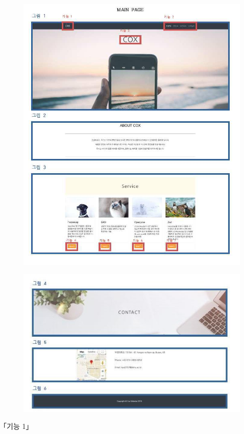 \documentclass{oblivoir}
\begin{document}
\begin{figure}[h!]
    \centering
    \includegraphics{pic/chp6/img921}
\end{figure}
\newpage
\begin{figure}[h!]
    \centering
    \includegraphics{pic/chp6/img928}
\end{figure}
｢기능 1｣
\end{document}
